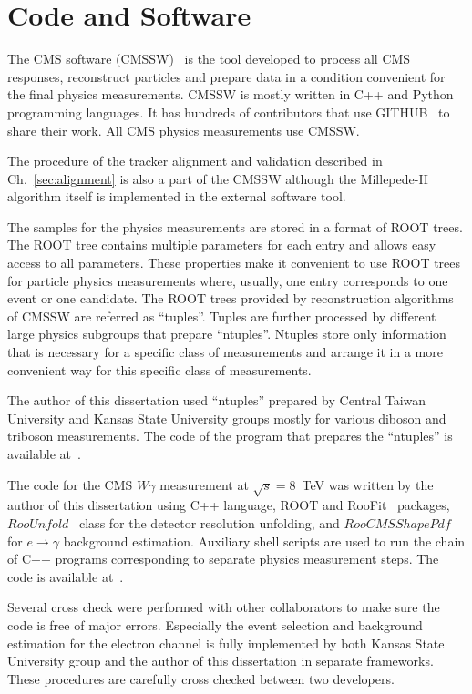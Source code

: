 \chapter{Code and Software}
\label{sec:Code}


The CMS software (CMSSW)~\cite{ref_CMSSW} is the tool developed to process all CMS responses, reconstruct particles and prepare data in a condition convenient for the final physics measurements. CMSSW is mostly written in C++ and Python programming languages. It has hundreds of contributors that use GITHUB~\cite{ref_GITHUB} to share their work. All CMS physics measurements use CMSSW.

The procedure of the tracker alignment and validation described in Ch.~\ref{sec:alignment} is also a part of the CMSSW although the Millepede-II algorithm itself is implemented in the external software tool.

The samples for the physics measurements are stored in a format of ROOT trees. The ROOT tree contains multiple parameters for each entry and allows easy access to all parameters. These properties make it convenient to use ROOT trees for particle physics measurements where, usually, one entry corresponds to one event or one candidate. The ROOT trees provided by reconstruction algorithms of CMSSW are referred as ``tuples''. Tuples are further processed by different large physics subgroups that prepare ``ntuples''. Ntuples store only information that is necessary for a specific class of measurements and arrange it in a more convenient way for this specific class of measurements.  

The author of this dissertation used ``ntuples'' prepared by Central Taiwan University and Kansas State University groups mostly for various diboson and triboson measurements. The code of the program that prepares the ``ntuples'' is available at~\cite{ref_ggNtuplizer}.

The code for the CMS $W\gamma$ measurement at $\sqrt{s}=8$~TeV was written by the author of this dissertation using C++ language, ROOT and RooFit~\cite{ref_RooFit} packages, $RooUnfold$~\cite{ref_RooUnfold} class for the detector resolution unfolding, and $RooCMSShapePdf$~\cite{ref_RooCMSShapePdf} for $e\rightarrow\gamma$ background estimation. Auxiliary shell scripts are used to run the chain of C++ programs corresponding to separate physics measurement steps. The code is available at~\cite{ref_GITHUB}.

Several cross check were performed with other collaborators to make sure the code is free of major errors. Especially the event selection and background estimation for the electron channel is fully implemented by both Kansas State University group and the author of this dissertation in separate frameworks. These procedures are carefully cross checked between two developers.  
